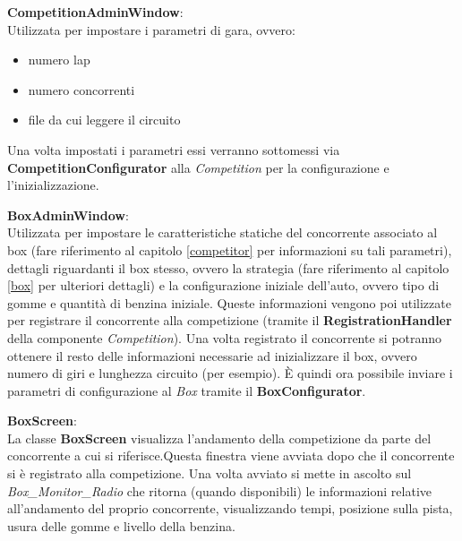 \begin{description}
\item{\textbf{CompetitionAdminWindow}}:\\
Utilizzata per impostare i parametri di gara, ovvero:
\begin{itemize}
\item numero lap
\item numero concorrenti
\item file da cui leggere il circuito
\end{itemize}
Una volta impostati i parametri essi verranno sottomessi via \textbf{CompetitionConfigurator} alla \emph{Competition} per la
configurazione e l'inizializzazione.
\item{\textbf{BoxAdminWindow}}:\\
Utilizzata per impostare le caratteristiche statiche del concorrente associato al box 
(fare riferimento al capitolo \ref{competitor} per informazioni su tali parametri), dettagli riguardanti il box stesso, ovvero la strategia 
(fare riferimento al capitolo \ref{box} per ulteriori dettagli) e la configurazione iniziale dell'auto, ovvero tipo di gomme e quantit\`{a} di
benzina iniziale. Queste informazioni vengono poi utilizzate per registrare il concorrente alla competizione (tramite il \textbf{RegistrationHandler}
della componente \emph{Competition}). Una volta registrato il concorrente si potranno ottenere il resto delle informazioni necessarie
ad inizializzare il box, ovvero numero di giri e lunghezza circuito (per esempio). \`{E} quindi ora possibile inviare i parametri di configurazione
al \emph{Box} tramite il \textbf{BoxConfigurator}.
\item{\textbf{BoxScreen}}:\\
La classe \textbf{BoxScreen} visualizza l'andamento della competizione da parte del concorrente a cui si riferisce.Questa finestra viene avviata dopo che il concorrente si \`{e} registrato alla competizione. Una volta avviato si mette in ascolto sul \emph{Box\_Monitor\_Radio} che ritorna (quando disponibili) le informazioni relative all'andamento del proprio concorrente, visualizzando tempi, posizione sulla pista, usura delle gomme e livello della benzina.
\end{description}
\newpage
